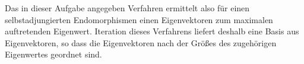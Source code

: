\documentclass[a4paper,10pt]{scrartcl}
\begin{document}
Das in dieser Aufgabe angegeben Verfahren ermittelt also für einen selbstadjungierten Endomorphismen einen Eigenvektoren zum maximalen auftretenden Eigenwert.
Iteration dieses Verfahrens liefert deshalb eine Basis aus Eigenvektoren, so dass die Eigenvektoren nach der Größes des zugehörigen Eigenwertes geordnet sind.
\end{document}
